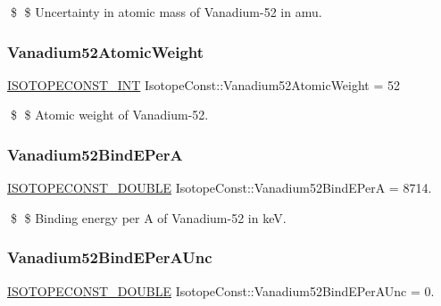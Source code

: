 \$ \$ Uncertainty in atomic mass of Vanadium-\/52 in amu. \mbox{\label{group___isotope_const-_vanadium-_v52_ga7105dbdd799b10747ccf11c1ad94f42b}} 
\subsubsection{\texorpdfstring{Vanadium52\+Atomic\+Weight}{Vanadium52AtomicWeight}}
{\footnotesize\ttfamily \mbox{\hyperlink{group___isotope_const-_macros_ga5f18360b3e99483a35c32d789e62621c}{I\+S\+O\+T\+O\+P\+E\+C\+O\+N\+S\+T\+\_\+\+I\+NT}} Isotope\+Const\+::\+Vanadium52\+Atomic\+Weight = 52}

\$ \$ Atomic weight of Vanadium-\/52. \mbox{\label{group___isotope_const-_vanadium-_v52_ga8cff4699162e28c3e072249aa76deb6d}} 
\subsubsection{\texorpdfstring{Vanadium52\+Bind\+E\+PerA}{Vanadium52BindEPerA}}
{\footnotesize\ttfamily \mbox{\hyperlink{group___isotope_const-_macros_ga8f45a7272ce02c0b4c65c44636ed719a}{I\+S\+O\+T\+O\+P\+E\+C\+O\+N\+S\+T\+\_\+\+D\+O\+U\+B\+LE}} Isotope\+Const\+::\+Vanadium52\+Bind\+E\+PerA = 8714.}

\$ \$ Binding energy per A of Vanadium-\/52 in keV. \mbox{\label{group___isotope_const-_vanadium-_v52_ga7f4d59f5fd41341620b4e774701d8950}} 
\subsubsection{\texorpdfstring{Vanadium52\+Bind\+E\+Per\+A\+Unc}{Vanadium52BindEPerAUnc}}
{\footnotesize\ttfamily \mbox{\hyperlink{group___isotope_const-_macros_ga8f45a7272ce02c0b4c65c44636ed719a}{I\+S\+O\+T\+O\+P\+E\+C\+O\+N\+S\+T\+\_\+\+D\+O\+U\+B\+LE}} Isotope\+Const\+::\+Vanadium52\+Bind\+E\+Per\+A\+Unc = 0.}

